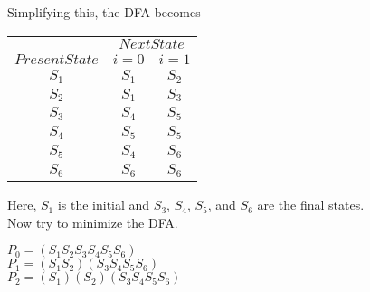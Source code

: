 \documentclass[a4,9pt]{beamer}
\begin{document}
\begin{frame}
Simplifying this, the DFA becomes

\begin{center}
\begin{tabular}{ccc}
 \hline

 \hline

 \hline

 \hline
 & \multicolumn{2}{c}{$Next State$}\\
 \cline{2-3}
 $Present State$ &  $i=0$ & $i=1$\\
\hline
 $S_1$   &   $S_1$      &  $S_2$ \\
 $S_2$   &   $S_1$      &  $S_3$   \\
 $S_3$   &   $S_4$      &  $S_5$   \\
 $S_4$   &   $S_5$      &  $S_5$   \\
 $S_5$   &   $S_4$      &  $S_6$  \\
 $S_6$   &   $S_6$      &  $S_6$  \\
 \hline

 \hline

 \hline

 \hline
\end{tabular}
\end{center}

\pause
Here, $S_1$ is the initial and $S_3$, $S_4$, $S_5$, and $S_6$ are the final states.\\
 \hspace*{0.5cm} Now try to minimize the DFA.
 \begin{center}
   $P_0 = (S_1 S_2 S_3 S_4 S_5 S_6)$\\
   $P_1 = (S_1 S_2)(S_3 S_4 S_5 S_6)$\\
   $P_2 = (S_1) (S_2) (S_3 S_4 S_5 S_6)$\\
 \end{center}
\end{frame}
\end{document}
